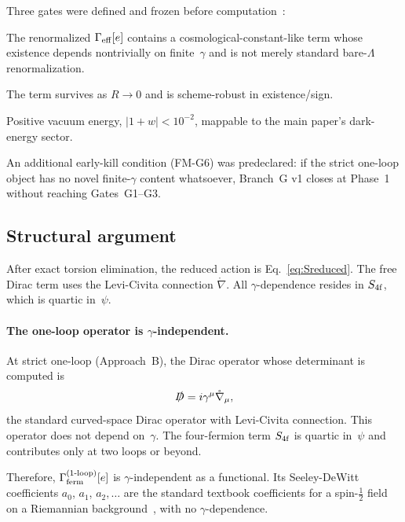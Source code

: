 \documentclass[11pt,letterpaper]{article}
\newcommand{\BI}{\gamma}               %
\newcommand{\Gam}{\Gamma_{\rm eff}}
\newcommand{\Sfour}{S_{\rm 4f}}
\begin{document}
Three gates were defined and frozen before computation~\cite{branchG_canonical}:
\begin{description}[style=nextline]
  \item[Gate~G1 (Nontrivial finite-$\BI$ vacuum structure)]
    The renormalized $\Gam[e]$ contains a cosmological-constant-like term
    whose existence depends nontrivially on finite~$\BI$ and is not merely
    standard bare-$\Lambda$ renormalization.
  \item[Gate~G2 (IR physicality)]
    The term survives as $R\to 0$ and is scheme-robust in existence/sign.
  \item[Gate~G3 (Dark energy viability)]
    Positive vacuum energy, $|1+w|<10^{-2}$, mappable to the main paper's
    dark-energy sector.
\end{description}
An additional early-kill condition (FM-G6) was predeclared: if the strict
one-loop object has no novel finite-$\BI$ content whatsoever, Branch~G v1
closes at Phase~1 without reaching Gates~G1--G3.

\subsection{Structural argument}\label{sec:branchG_argument}

After exact torsion elimination, the reduced action is
Eq.~\eqref{eq:Sreduced}. The free Dirac term uses the Levi-Civita connection
$\mathring\nabla$. All $\BI$-dependence resides in $\Sfour$, which is quartic
in~$\psi$.

\paragraph{The one-loop operator is $\BI$-independent.}
At strict one-loop (Approach~B), the Dirac operator whose determinant is
computed is
\begin{equation}\label{eq:Dirac}
  \slashed{D} = i\gamma^\mu\mathring\nabla_\mu,
\end{equation}
the standard curved-space Dirac operator with Levi-Civita connection. This
operator does not depend on~$\BI$. The four-fermion term $\Sfour$ is quartic
in~$\psi$ and contributes only at two loops or beyond.

Therefore, $\Gamma^{(1\text{-loop})}_{\rm ferm}[e]$ is $\BI$-independent as a
functional. Its Seeley-DeWitt coefficients $a_0$, $a_1$, $a_2,\ldots$ are the
standard textbook coefficients for a spin-$\tfrac{1}{2}$ field on a Riemannian
background~\cite{Vassilevich2003}, with no $\BI$-dependence.
\end{document}
